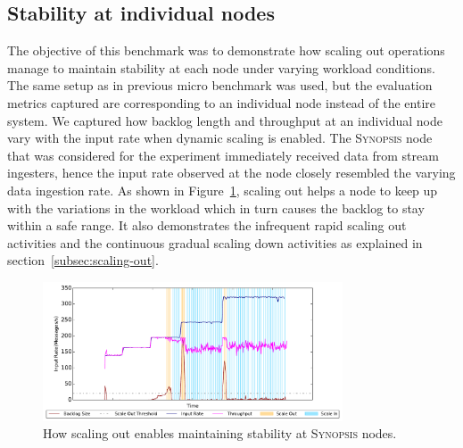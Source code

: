 \subsection{Stability at individual nodes}
The objective of this benchmark was to demonstrate how scaling out operations manage to maintain stability at each node under varying workload conditions.
The same setup as in previous micro benchmark was used, but the evaluation metrics captured are corresponding to an individual node instead of the entire system.
We captured how backlog length and throughput at an individual node vary with the input rate when dynamic scaling is enabled.
The \textsc{Synopsis} node that was considered for the experiment immediately received data from stream ingesters, hence the input rate observed at the node closely resembled the varying data ingestion rate.
As shown in Figure~\ref{fig:stability-backlog}, scaling out helps a node to keep up with the variations in the workload which in turn causes the backlog to stay within a safe range.
It also demonstrates the infrequent rapid scaling out activities and the continuous gradual scaling down activities as explained in section~\ref{subsec:scaling-out}.
\begin{figure}
    \centerline{\includegraphics[width=3.5in]{figures/stability_partial.pdf}}
    \caption{How scaling out enables maintaining stability at \textsc{Synopsis} nodes.}
    \label{fig:stability-backlog}
\end{figure}

